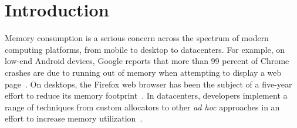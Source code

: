 




\section{Introduction}
\label{sec:introduction}

Memory consumption is a serious concern across the spectrum of modern
computing platforms, from mobile to desktop to datacenters. For
example, on low-end Android devices, Google reports that more than 99
percent of Chrome crashes are due to running out of memory when
attempting to display a web page~\cite{hara:stateofblink}. On
desktops, the Firefox web browser has been the subject of a five-year
effort to reduce its memory footprint~\cite{awsy}. In datacenters,
developers implement a range of techniques from custom allocators to
other \emph{ad hoc} approaches in an effort to increase memory
utilization~\cite{jemalloc:exposehints,redis:announcement}.


